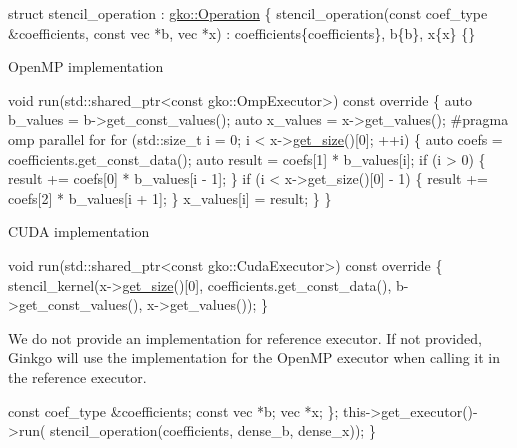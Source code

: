 \begin{DoxyCode}
\textcolor{keyword}{struct }stencil\_operation : \hyperlink{classgko_1_1Operation}{gko::Operation} \{
    stencil\_operation(\textcolor{keyword}{const} coef\_type &coefficients, \textcolor{keyword}{const} vec *b,
                      vec *x)
        : coefficients\{coefficients\}, b\{b\}, x\{x\}
    \{\}
\end{DoxyCode}


Open\+MP implementation


\begin{DoxyCode}
            \textcolor{keywordtype}{void} run(std::shared\_ptr<const gko::OmpExecutor>)\textcolor{keyword}{ const override}
\textcolor{keyword}{            }\{
                \textcolor{keyword}{auto} b\_values = b->get\_const\_values();
                \textcolor{keyword}{auto} x\_values = x->get\_values();
\textcolor{preprocessor}{#pragma omp parallel for}
                \textcolor{keywordflow}{for} (std::size\_t i = 0; i < x->\hyperlink{classgko_1_1LinOp_a31b3c003388eb0b95393154f68c2b98d}{get\_size}()[0]; ++i) \{
                    \textcolor{keyword}{auto} coefs = coefficients.get\_const\_data();
                    \textcolor{keyword}{auto} result = coefs[1] * b\_values[i];
                    \textcolor{keywordflow}{if} (i > 0) \{
                        result += coefs[0] * b\_values[i - 1];
                    \}
                    \textcolor{keywordflow}{if} (i < x->get\_size()[0] - 1) \{
                        result += coefs[2] * b\_values[i + 1];
                    \}
                    x\_values[i] = result;
                \}
            \}
\end{DoxyCode}


C\+U\+DA implementation


\begin{DoxyCode}
\textcolor{keywordtype}{void} run(std::shared\_ptr<const gko::CudaExecutor>)\textcolor{keyword}{ const override}
\textcolor{keyword}{}\{
    stencil\_kernel(x->\hyperlink{classgko_1_1LinOp_a31b3c003388eb0b95393154f68c2b98d}{get\_size}()[0], coefficients.get\_const\_data(),
                   b->get\_const\_values(), x->get\_values());
\}
\end{DoxyCode}


We do not provide an implementation for reference executor. If not provided, Ginkgo will use the implementation for the Open\+MP executor when calling it in the reference executor.


\begin{DoxyCode}
        \textcolor{keyword}{const} coef\_type &coefficients;
        \textcolor{keyword}{const} vec *b;
        vec *x;
    \};
    this->get\_executor()->run(
        stencil\_operation(coefficients, dense\_b, dense\_x));
\}
\end{DoxyCode}


